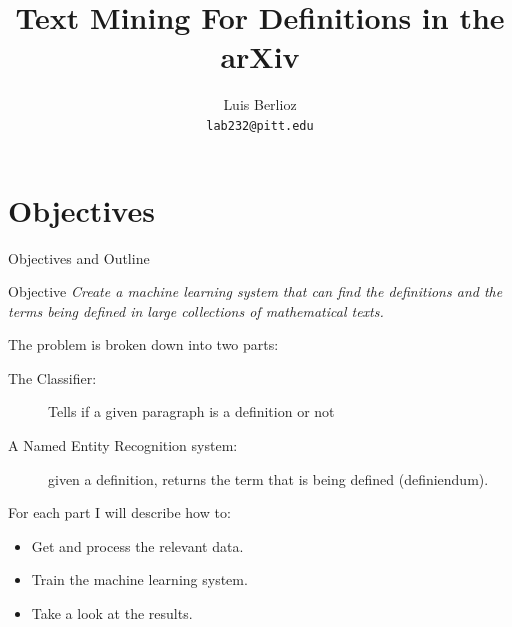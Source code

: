 \documentclass[10pt]{beamer}
\title{Text Mining For Definitions in the arXiv}
\author{Luis Berlioz\\
\texttt{lab232@pitt.edu}}
\institute{Formal Methods in Mathematics /
Lean Together 2020}
\begin{document}
\begin{frame}
\titlepage
\end{frame}
\section{Objectives}

\begin{frame}{Objectives and Outline}
    \begin{block}{Objective}
    \textit{Create a machine learning system that can find the definitions and the terms being defined in large collections of mathematical texts. }
    \end{block}


    The problem is broken down into two parts:
\begin{description}
    \item[The Classifier:] Tells if a given paragraph is a definition or not
    \item[A Named Entity Recognition system:] given a definition, returns the term that is being defined (definiendum).
\end{description}
For each part I will describe how to:
        \begin{itemize}
                \item Get and process the relevant  data.
                \item Train the machine learning system.
                \item Take a look at the results.
        \end{itemize}
\end{frame}
\end{document}
